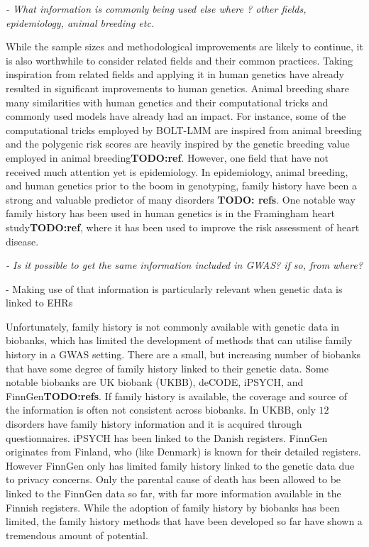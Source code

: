 {\itshape
- What information is commonly being used else where ? other fields, epidemiology, animal breeding etc.
}

While the sample sizes and methodological improvements are likely to continue, it is also worthwhile to consider related fields and their common practices. Taking inspiration from related fields and applying it in human genetics have already resulted in significant improvements to human genetics. Animal breeding share many similarities with human genetics and their computational tricks and commonly used models have already had an impact. For instance, some of the computational tricks employed by BOLT-LMM are inspired from animal breeding and the polygenic risk scores are heavily inspired by the genetic breeding value employed in animal breeding\textbf{TODO:ref}. However, one field that have not received much attention yet is epidemiology. In epidemiology, animal breeding, and human genetics prior to the boom in genotyping, family history have been a strong and valuable predictor of many disorders \textbf{TODO: refs}. One notable way family history has been used in human genetics is in the Framingham heart study\textbf{TODO:ref}, where it has been used to improve the risk assessment of heart disease.


{\itshape
- Is it possible to get the same information included in GWAS? if so, from where?

	- Making use of that information is particularly relevant when genetic data is linked to EHRs
}

Unfortunately, family history is not commonly available with genetic data in biobanks, which has limited the development of methods 
that can utilise family history in a GWAS setting. There are a small, but increasing number of biobanks that have some degree of 
family history linked to their genetic data. Some notable biobanks are UK biobank (UKBB), deCODE, iPSYCH, and 
FinnGen\textbf{TODO:refs}. If family history is available, the coverage and source of the information is often not consistent across 
biobanks. In UKBB, only $ 12 $ disorders have family history information and it is acquired through questionnaires. iPSYCH has been 
linked to the Danish registers. FinnGen originates from Finland, who (like Denmark) is known for their detailed registers. However 
FinnGen only has limited family history linked to the genetic data due to privacy concerns. Only the parental cause of death has been 
allowed to be linked to the FinnGen data so far, with far more information available in the Finnish registers. While the adoption 
of family history by biobanks has been limited, the family history methods that have been developed so far have shown a tremendous 
amount of potential. 

